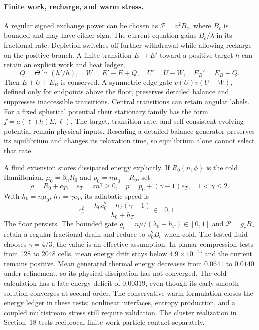 \paragraph{Finite work, recharge, and warm stress.}
A regular signed exchange power can be chosen as $\mathcal P=v^2 B_c$,
where $B_c$ is bounded and may have either sign. The current equation gains
$B_c/\lambda$ in its fractional rate. Depletion switches off further
withdrawal while allowing recharge on the positive branch. A finite
transition $E\to E'$ toward a positive target $h$ can retain an explicit
work and heat ledger,
\[
Q=\Theta\ln(h'/h),\quad W=E'-E+Q,\quad
U'=U-W,\quad E_B'=E_B+Q.
\]
Then $E+U+E_B$ is conserved. A symmetric edge gate $v(U)v(U-W)$,
defined only for endpoints above the floor, preserves detailed balance
and suppresses inaccessible transitions. Central transitions can retain
angular labels. For a fixed spherical potential their stationary family
has the form $f=a(\ell)h(E,\ell)$. The target, transition rate, and
self-consistent evolving potential remain physical inputs. Rescaling a
detailed-balance generator preserves its equilibrium and changes its
relaxation time, so equilibrium alone cannot select that rate.

A fluid extension stores dissipated energy explicitly. If $R_0(n,\phi)$
is the cold Hamiltonian, $\mu_0=\partial_nR_0$ and $p_0=n\mu_0-R_0$, set
\[
\rho=R_0+e_T,\quad e_T=z n^\gamma\ge0,\quad
p=p_0+(\gamma-1)e_T,\quad 1<\gamma\le2.
\]
With $h_0=n\mu_0$, $h_T=\gamma e_T$, its adiabatic speed is
\[
c_s^2=\frac{h_0c_0^2+h_T(\gamma-1)}{h_0+h_T}\in[0,1].
\]
The floor persists. The bounded gate
$g_c=n\mu/(\lambda_0+h_T)\in[0,1]$ and
$\mathcal P=g_cB_c$ retain a regular fractional drain and reduce to
$v_0^2B_c$ when cold. The tested fluid chooses $\gamma=4/3$; the value
is an effective assumption. In planar compression tests from 128 to
2048 cells, mean energy drift stays below $4.9\times10^{-15}$ and the
current remains positive. Mean generated thermal energy decreases from
$0.0641$ to $0.0140$ under refinement, so its physical dissipation has
not converged. The cold calculation has a late energy deficit of
$0.00319$, even though its early smooth solution converges at second
order. The conservative warm formulation closes the energy ledger in
these tests; nonlinear interfaces, entropy production, and a coupled
multistream stress still require validation. The cluster realization in
Section~18 tests reciprocal finite-work particle contact separately.

